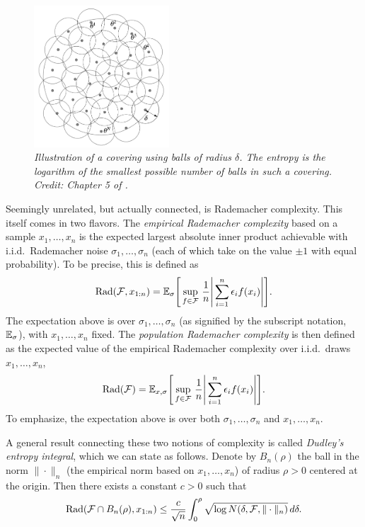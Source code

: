 \documentclass{article}
\begin{document}
\begin{figure}[tb]
\centering
\includegraphics[width=0.45\textwidth]{covering.pdf}
\caption{\it Illustration of a covering using balls of radius $\delta$. The
  entropy is the logarithm of the smallest possible number of balls in such a
  covering. Credit: Chapter 5 of \citet{wainwright2019high}.}
\label{fig:covering}
\end{figure}

Seemingly unrelated, but actually connected, is Rademacher complexity. This
itself comes in two flavors. The \emph{empirical Rademacher complexity} based on
a sample $x_1,\dots,x_n$ is the expected largest absolute inner product
achievable with i.i.d.\ Rademacher noise $\sigma_1,\dots,\sigma_n$ (each of 
which take on the value $\pm 1$ with equal probability). To be precise, this is 
defined as   
\[
\mathrm{Rad}(\mathcal{F}, x_{1:n}) = \mathbb{E}_\sigma \Bigg[ \sup_{f \in \mathcal{F}} \, \frac{1}{n} \Bigg| 
\sum_{i=1}^n \epsilon_i f(x_i) \Bigg| \Bigg]. 
\]
The expectation above is over $\sigma_1,\dots,\sigma_n$ (as signified by the
subscript notation, $\mathbb{E}_\sigma$), with $x_1,\dots,x_n$ fixed. The
\emph{population Rademacher complexity} is then defined as the expected value of
the empirical Rademacher complexity over i.i.d.\ draws $x_1,\dots,x_n$,
\[
\mathrm{Rad}(\mathcal{F}) = \mathbb{E}_{x,\sigma} \Bigg[ \sup_{f \in \mathcal{F}} \, \frac{1}{n} \Bigg| 
\sum_{i=1}^n \epsilon_i f(x_i) \Bigg| \Bigg]. 
\]
To emphasize, the expectation above is over both $\sigma_1,\dots,\sigma_n$ and
$x_1,\dots,x_n$.

A general result connecting these two notions of complexity is called
\emph{Dudley's entropy integral}, which we can state as follows. Denote by
$B_n(\rho)$ the ball in the norm $\|\cdot\|_n$ (the empirical norm based on
$x_1,\dots,x_n$) of radius $\rho>0$ centered at the origin. Then there exists a
constant $c>0$ such that  
\begin{equation}
\label{eq:dudley_integral}
\mathrm{Rad}(\mathcal{F} \cap B_n(\rho), x_{1:n}) \leq \frac{c}{\sqrt n} \int_0^\rho
\sqrt{\log N(\delta, \mathcal{F}, \|\cdot\|_n)} \, d \delta.
\end{equation}
\end{document}
